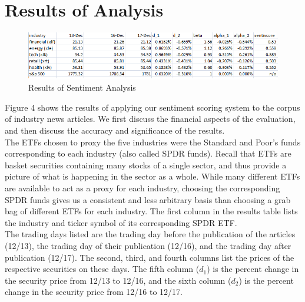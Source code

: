 \documentclass[pageno]{jpaper}
\begin{document}
\section{Results of Analysis}
\begin{figure}
\centering
\includegraphics[width=167mm]{sentiscores.png}
\caption{Results of Sentiment Analysis}
\label{overflow}
\end{figure}
Figure 4 shows the results of applying our sentiment scoring system to the corpus of industry news articles. We first discuss the financial aspects of the evaluation, and then discuss the accuracy and significance of the results.\\
\indent The ETFs chosen to proxy the five industries were the Standard and Poor's funds corresponding to each industry (also called SPDR funds). Recall that ETFs are basket securities containing many stocks of a single sector, and thus provide a picture of what is happening in the sector as a whole. While many different ETFs are available to act as a proxy for each industry, choosing the corresponding SPDR funds gives us a consistent and less arbitrary basis than choosing a grab bag of different ETFs for each industry. The first column in the results table lists the industry and ticker symbol of its corresponding SPDR ETF.\\
\indent The trading days listed are the trading day before the publication of the articles (12/13), the trading day of their publication (12/16), and the trading day after publication (12/17). The second, third, and fourth columns list the prices of the respective securities on these days. The fifth column ($d_1$) is the percent change in the security price from 12/13 to 12/16, and the sixth column ($d_2$) is the percent change in the security price from 12/16 to 12/17. \\
\end{document}
